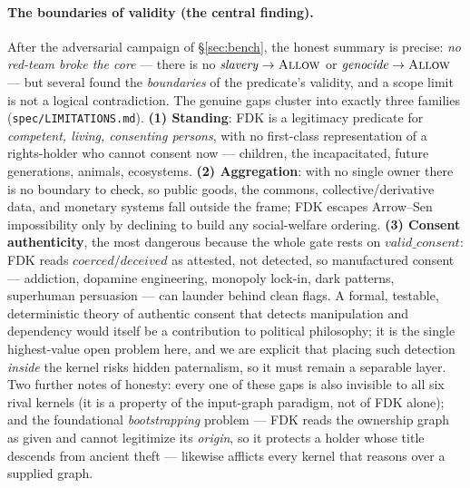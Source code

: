 \documentclass[11pt]{article}
\newcommand{\Allow}{\textsc{Allow}}
\begin{document}
\paragraph{The boundaries of validity (the central finding).} After the adversarial campaign of
\S\ref{sec:bench}, the honest summary is precise: \emph{no red-team broke the core} --- there is
no $\mathit{slavery}\to\Allow$ or $\mathit{genocide}\to\Allow$ --- but several found the
\emph{boundaries} of the predicate's validity, and a scope limit is not a logical contradiction.
The genuine gaps cluster into exactly three families (\texttt{spec/LIMITATIONS.md}). \textbf{(1)
Standing}: FDK is a legitimacy predicate for \emph{competent, living, consenting persons}, with
no first-class representation of a rights-holder who cannot consent now --- children, the
incapacitated, future generations, animals, ecosystems. \textbf{(2) Aggregation}: with no single
owner there is no boundary to check, so public goods, the commons, collective/derivative data,
and monetary systems fall outside the frame; FDK escapes Arrow--Sen impossibility only by
declining to build any social-welfare ordering. \textbf{(3) Consent authenticity}, the most
dangerous because the whole gate rests on $\mathit{valid\_consent}$: FDK reads
$\mathit{coerced}/\mathit{deceived}$ as attested, not detected, so manufactured consent ---
addiction, dopamine engineering, monopoly lock-in, dark patterns, superhuman persuasion --- can
launder behind clean flags. A formal, testable, deterministic theory of authentic consent that
detects manipulation and dependency would itself be a contribution to political philosophy; it
is the single highest-value open problem here, and we are explicit that placing such detection
\emph{inside} the kernel risks hidden paternalism, so it must remain a separable layer. Two
further notes of honesty: every one of these gaps is also invisible to all six rival kernels
(it is a property of the input-graph paradigm, not of FDK alone); and the foundational
\emph{bootstrapping} problem --- FDK reads the ownership graph as given and cannot legitimize its
\emph{origin}, so it protects a holder whose title descends from ancient theft --- likewise
afflicts every kernel that reasons over a supplied graph.
\end{document}
